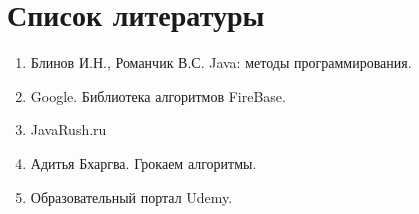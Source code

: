 \documentclass[utf8,14pt,a4paper,oneside,russian]{book}
\begin{document}
	\newpage
	
	\section{Список литературы}
	
	\begin{enumerate}
		\item Блинов И.Н., Романчик В.С. Java: методы программирования.
		\item Google. Библиотека алгоритмов FireBase.
		\item JavaRush.ru
		\item Адитья Бхаргва. Грокаем алгоритмы.
		\item Образовательный портал Udemy.
	\end{enumerate}		
	
\end{document}
